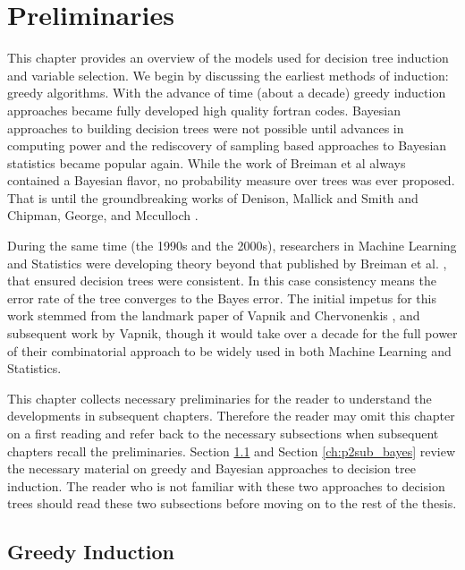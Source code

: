 \section{Preliminaries}
\label{ch:preliminaries}
This chapter provides an overview of the models used for decision tree induction and variable selection. We begin by discussing the earliest methods of induction: greedy algorithms. With the advance of time (about a decade) greedy induction approaches became fully developed high quality fortran codes. Bayesian approaches to building decision trees were not possible until advances in computing power and the rediscovery of sampling based approaches to Bayesian statistics became popular again. While the work of Breiman et al \cite{breiman1984classification} always contained a Bayesian flavor, no probability measure over trees was ever proposed. That is until the groundbreaking works of Denison, Mallick and Smith \cite{denison1998bayesian} and Chipman, George, and Mcculloch \cite{chipman1998bayesian}.

 During the same time (the 1990s and the 2000s), researchers in Machine Learning and Statistics were developing theory beyond that published by Breiman et al. \cite{breiman1984classification}, that ensured decision trees were consistent. In this case consistency means the error rate of the tree converges to the Bayes error. The initial impetus for this work stemmed from the landmark paper of Vapnik and Chervonenkis \cite{vapnik1971uniform}, and subsequent work by Vapnik\cite{vapnik2000nature}, though it would take over a decade for the full power of their combinatorial approach to be widely used in both Machine Learning and Statistics. 

This chapter collects necessary preliminaries for the reader to understand the developments in subsequent chapters. Therefore the reader may omit this chapter on a first reading and refer back to the necessary subsections when subsequent chapters recall the preliminaries. Section \ref{ch:p1sub_greedy_ind} and Section \ref{ch:p2sub_bayes} review the necessary material on greedy and Bayesian approaches to decision tree induction. The reader who is not familiar with these two approaches to decision trees should read these two subsections before moving on to the rest of the thesis.  

\subsection{Greedy Induction}
\label{ch:p1sub_greedy_ind}

